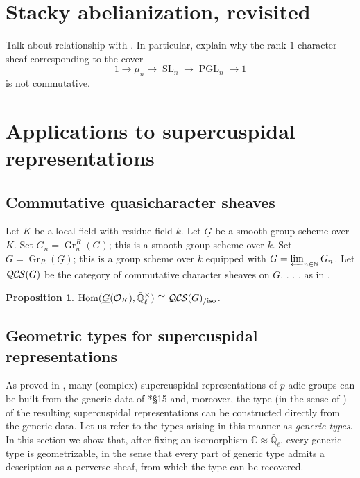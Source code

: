 \documentclass[10pt]{amsart}
\theoremstyle{plain}
\newtheorem{proposition}[theorem]{Proposition}
\theoremstyle{definition}
\newcommand{\NN}{{\mathbb{N}}}
\newcommand{\CC}{{\mathbb{C}}}
\newcommand{\EE}{\mathbb{\bar Q}_\ell}
\newcommand{\OK}{\mathcal{O}_K}
\newcommand{\Fq}{k}
\newcommand{\EEx}{\EE^\times}
\DeclareMathOperator{\Hom}{Hom}
\DeclareMathOperator{\Gr}{Gr}
\DeclareMathOperator{\SL}{SL}
\DeclareMathOperator{\PGL}{PGL}
\newcommand{\iso}{{\ \cong\ }}
\newcommand{\QCS}{{\mathcal{QC\hskip-0.8pt S}}}
\newcommand{\QCSiso}[1]{\QCS(#1)_{/\text{iso}}}
\begin{document}
\section{Stacky abelianization, revisited}\label{sec:stacky}
 
 Talk about relationship with \cite{kamgarpour:09a}.  In particular, explain why the rank-$1$ character sheaf corresponding
 to the cover
 \[
 1 \to \mu_n \to \SL_n \to \PGL_n \to 1
 \]
 is not commutative.  

\section{Applications to supercuspidal representations}

\subsection{Commutative quasicharacter sheaves}

Let $K$ be a local field with residue field $\Fq$.
Let $\underline{G}$ be a smooth group scheme over $K$.
Set $G_n = \Gr^R_n(\underline{G})$; this is a smooth group scheme over $\Fq$.
Set $G = \Gr_R(\underline{G})$; this is a group scheme over $\Fq$ equipped with $G = \varprojlim_{n\in \NN} G_n$.
Let $\QCS(G)$ be the category of commutative character sheaves on $G$. . . .  as in \cite{cunningham-roe:13a}.

\begin{proposition}\label{prop:QCS}
$\Hom(\underline{G}(\OK),\EEx) \iso \QCSiso{G}$.
\end{proposition}

 \subsection{Geometric types for supercuspidal representations}


As proved in \cite{kim:07a}, many (complex) supercuspidal representations of $p$-adic groups can be built from the generic data of \cite{yu:01a}*{\S 15} and, moreover, the type (in the sense of \cite{bushnell-kutzko:98a}) of the resulting supercuspidal representations can be constructed directly from the generic data. 
Let us refer to the types arising in this manner as {\it generic types}.
In this section we show that, after fixing an isomorphism $\CC \approx \EE$, every generic type is geometrizable, in the sense that every part of generic type admits a description as a perverse sheaf, from which the type can be recovered.
\end{document}
